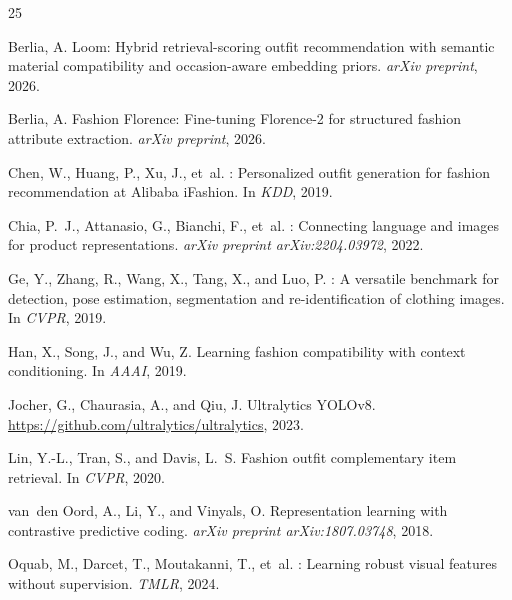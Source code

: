 \documentclass[10pt,twocolumn]{article}
\begin{document}

\begin{thebibliography}{25}

Berlia, A.
\newblock Loom: Hybrid retrieval-scoring outfit recommendation with semantic
material compatibility and occasion-aware embedding priors.
\newblock \emph{arXiv preprint}, 2026.

Berlia, A.
\newblock Fashion {Florence}: Fine-tuning {Florence-2} for structured fashion
attribute extraction.
\newblock \emph{arXiv preprint}, 2026.

Chen, W., Huang, P., Xu, J., et~al.
: Personalized outfit generation for fashion recommendation at
{Alibaba iFashion}.
\newblock In \emph{KDD}, 2019.

Chia, P.~J., Attanasio, G., Bianchi, F., et~al.
: Connecting language and images for product
representations.
\newblock \emph{arXiv preprint arXiv:2204.03972}, 2022.

Ge, Y., Zhang, R., Wang, X., Tang, X., and Luo, P.
: A versatile benchmark for detection, pose estimation,
segmentation and re-identification of clothing images.
\newblock In \emph{CVPR}, 2019.

Han, X., Song, J., and Wu, Z.
\newblock Learning fashion compatibility with context conditioning.
\newblock In \emph{AAAI}, 2019.

Jocher, G., Chaurasia, A., and Qiu, J.
\newblock Ultralytics {YOLOv8}.
\newblock \url{https://github.com/ultralytics/ultralytics}, 2023.

Lin, Y.-L., Tran, S., and Davis, L.~S.
\newblock Fashion outfit complementary item retrieval.
\newblock In \emph{CVPR}, 2020.

van~den Oord, A., Li, Y., and Vinyals, O.
\newblock Representation learning with contrastive predictive coding.
\newblock \emph{arXiv preprint arXiv:1807.03748}, 2018.

Oquab, M., Darcet, T., Moutakanni, T., et~al.
: Learning robust visual features without supervision.
\newblock \emph{TMLR}, 2024.


\end{thebibliography}
\end{document}
